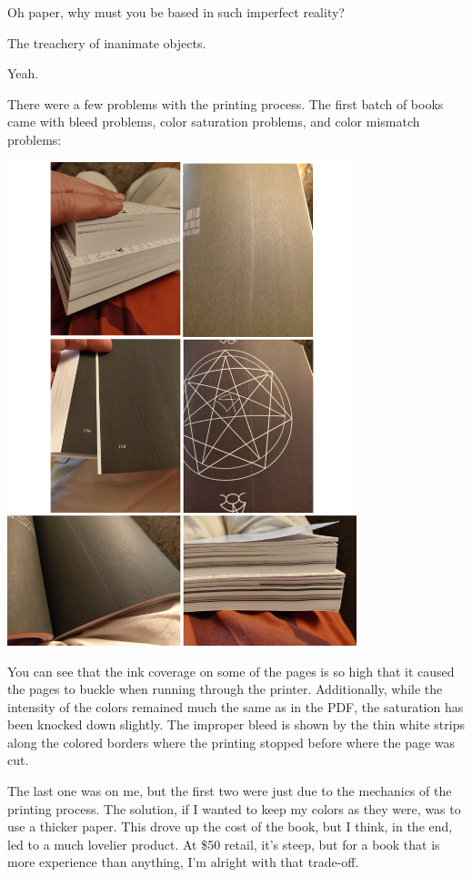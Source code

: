 \begin{paracol}{2}
\begin{leftcolumn}
Oh paper, why must you be based in such imperfect reality?

\begin{ally}
	The treachery of inanimate objects.
\end{ally}
Yeah.

There were a few problems with the printing process. The first batch of books came with bleed problems, color saturation problems, and color mismatch problems:

\includegraphics[width=4in]{assets/print-problems.png}

You can see that the ink coverage on some of the pages is so high that it caused the pages to buckle when running through the printer. Additionally, while the intensity of the colors remained much the same as in the PDF, the saturation has been knocked down slightly. The improper bleed is shown by the thin white strips along the colored borders where the printing stopped before where the page was cut.

The last one was on me, but the first two were just due to the mechanics of the printing process. The solution, if I wanted to keep my colors as they were, was to use a thicker paper. This drove up the cost of the book, but I think, in the end, led to a much lovelier product. At \$50 retail, it's steep, but for a book that is more experience than anything, I'm alright with that trade-off.


\end{leftcolumn}
\end{paracol}

